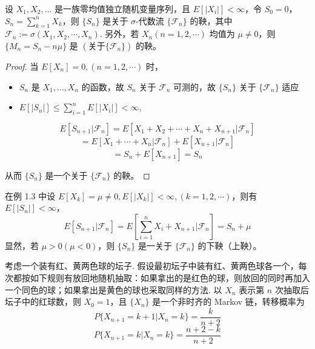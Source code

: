 \documentclass[lang=cn,10pt,thmcnt=section]{elegantbook}
\begin{document}
\begin{example}
	设 $X_1, X_2, \ldots$ 是一族零均值独立随机变量序列，且 $E[|X_i|] < \infty$，令 $S_0 = 0$，$S_n = \sum_{k=1}^n X_k$，则 $\{S_n\}$ 是关于 $\sigma$-代数流 $\{\mathcal{F}_n\}$ 的鞅，其中 $\mathcal{F}_n := \sigma(X_1, X_2, \cdots, X_n)$. 另外，若 $X_n (n = 1, 2, \cdots)$ 均值为 $\mu \neq 0$，则 $\{M_n = S_n - n\mu\}$ 是 $(\text{关于} \{\mathcal{F}_n\})$ 的鞅。

\end{example}
\begin{proof}
	当 $E[X_n] = 0, (n = 1, 2, \cdots)$ 时，
\begin{itemize}
    \item $S_n$ 是 $X_1, \ldots, X_n$ 的函数，故 $S_n$ 关于 $\mathcal{F}_n$ 可测的，故 $\{S_n\}$ 关于 $\{\mathcal{F}_n\}$ 适应
    \item $E[|S_n|] \leq \sum_{i=1}^n E[|X_i|] < \infty$,
\end{itemize}

\[
E[S_{n+1}|\mathcal{F}_n] = E[X_1 + X_2 + \cdots + X_n + X_{n+1}|\mathcal{F}_n]
\]
\[
= E[X_1 + \cdots + X_n|\mathcal{F}_n] + E[X_{n+1}|\mathcal{F}_n]
\]
\[
= S_n + E[X_{n+1}] = S_n
\]

从而 $\{S_n\}$ 是一个关于 $\{\mathcal{F}_n\}$ 的鞅。
\end{proof}
\begin{example}
	在例 1.3 中设 $E[X_k] = \mu \neq 0, E[|X_k|] < \infty, (k = 1, 2, \cdots)$，则有 $E[|S_n|] < \infty$，
\[
E[S_{n+1}|\mathcal{F}_n] = E\left[\sum_{i=1}^n X_i + X_{n+1}|\mathcal{F}_n\right] = S_n + \mu
\]
显然，若 $\mu > 0 (\mu < 0)$，则 $\{S_n\}$ 是一关于 $\{\mathcal{F}_n\}$ 的下鞅（上鞅）。
\end{example}
\begin{example}
	 考虑一个装有红、黄两色球的坛子. 假设最初坛子中装有红、黄两色球各一个，每次都按如下规则有放回地随机抽取：如果拿出的是红色的球，则放回的同时再加入一个同色的球；如果拿出是黄色的球也采取同样的方法. 以 $X_n$ 表示第 $n$ 次抽取后坛子中的红球数，则 $X_0 = 1$，且 $\{X_n\}$ 是一个非时齐的 Markov 链，转移概率为
\[
P\{X_{n+1} = k+1 | X_n = k\} = \frac{k}{n+2}
\]
\[
P\{X_{n+1} = k | X_n = k\} = \frac{n+2-k}{n+2}
\]

\end{example}
\end{document}
